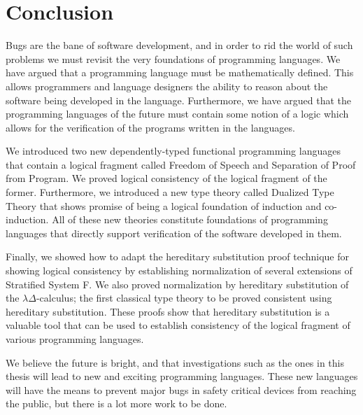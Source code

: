 \documentclass[phd,dedicationpage,ackpage,epigraphpage,figures]{uithesis}
\begin{document}
\chapter*{\normalfont Conclusion \vspace{14px}}
\label{chap:conclusion}

Bugs are the bane of software development, and in order to rid the
world of such problems we must revisit the very foundations of
programming languages.  We have argued that a programming language
must be mathematically defined.  This allows programmers and language
designers the ability to reason about the software being developed in
the language.  Furthermore, we have argued that the programming
languages of the future must contain some notion of a logic which
allows for the verification of the programs written in the languages.

We introduced two new dependently-typed functional programming
languages that contain a logical fragment called Freedom of Speech and
Separation of Proof from Program.  We proved logical consistency of
the logical fragment of the former.  Furthermore, we introduced a new
type theory called Dualized Type Theory that shows promise of being a
logical foundation of induction and co-induction.  All of these new
theories constitute foundations of programming languages that directly
support verification of the software developed in them.

Finally, we showed how to adapt the hereditary substitution proof
technique for showing logical consistency by establishing
normalization of several extensions of Stratified System F.  We also
proved normalization by hereditary substitution of the
$\lambda\Delta$-calculus; the first classical type theory to be proved
consistent using hereditary substitution.  These proofs show that
hereditary substitution is a valuable tool that can be used to
establish consistency of the logical fragment of various programming
languages.

We believe the future is bright, and that investigations such as the
ones in this thesis will lead to new and exciting programming
languages.  These new languages will have the means to prevent major
bugs in safety critical devices from reaching the public, but there is
a lot more work to be done.
\end{document}
